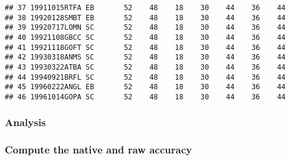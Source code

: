 \documentclass[
]{article}
\newenvironment{Shaded}{\begin{snugshade}}{\end{snugshade}}
\newcommand{\AttributeTok}[1]{\textcolor[rgb]{0.77,0.63,0.00}{#1}}
\newcommand{\DecValTok}[1]{\textcolor[rgb]{0.00,0.00,0.81}{#1}}
\newcommand{\FunctionTok}[1]{\textcolor[rgb]{0.00,0.00,0.00}{#1}}
\newcommand{\NormalTok}[1]{#1}
\newcommand{\OtherTok}[1]{\textcolor[rgb]{0.56,0.35,0.01}{#1}}
\newcommand{\SpecialCharTok}[1]{\textcolor[rgb]{0.00,0.00,0.00}{#1}}
\newcommand{\StringTok}[1]{\textcolor[rgb]{0.31,0.60,0.02}{#1}}
\begin{document}
\begin{verbatim}
## 37 19911015RTFA EB       52    48    18    30    44    36    44
## 38 19920128SMBT EB       52    48    18    30    44    36    44
## 39 19920717LOMN SC       52    48    18    30    44    36    44
## 40 19921108GBCC SC       52    48    18    30    44    36    44
## 41 19921118GOFT SC       52    48    18    30    44    36    44
## 42 19930318ANMS SC       52    48    18    30    44    36    44
## 43 19930322ATBA SC       52    48    18    30    44    36    44
## 44 19940921BRFL SC       52    48    18    30    44    36    44
## 45 19960222ANGL EB       52    48    18    30    44    36    44
## 46 19961014GOPA SC       52    48    18    30    44    36    44
\end{verbatim}

\hypertarget{analysis}{%
\subsubsection{Analysis}\label{analysis}}

\hypertarget{compute-the-native-and-raw-accuracy}{%
\subsubsection{Compute the native and raw
accuracy}\label{compute-the-native-and-raw-accuracy}}

\begin{Shaded}
\end{Shaded}
\end{document}
